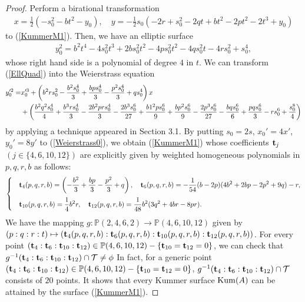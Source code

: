 \documentclass[10pt]{article}
\begin{document}
\begin{proof}
Perform a birational transformation 
\begin{align*}
x=\frac{1}{2} (- s_0^2 - b t^2 - y_0),
\quad
y=-\frac{1}{2} s_0 (-2 r +  s_0^2 - 2 q t + b t^2 - 2 p t^2 - 2 t^3 + y_0)
\end{align*}
to (\ref{KummerM1}).
Then, we have an elliptic surface
\begin{align}\label{EllQuad}
y_0^2= b^2 t^4- 4 s_0^2 t^3 + 2 b s_0^2 t^2 - 4 p s_0^2 t^2 - 4 q s_0^2 t -4 r s_0^2 + s_0^4,
\end{align}
whose right hand side is a polynomial of degree $4$ in $t$.
We can transform (\ref{EllQuad}) into the Weierstrass equation
\begin{align}\label{Weierstrass0}
y_0'^2= &x_0'^3+ \left(b^2 r s_0^2 - \frac{b^2 s_0^4}{3} + \frac{b p s_0^4}{3}  - \frac{p^2 s_0^4}{3} +  q s_0^4 \right) x \notag\\
&+\left(\frac{b^2 q^2 s_0^4}{4} + \frac{b^3 r s_0^4}{3} - \frac{2b^2 p r s_0^4 }{3}  - \frac{ 2 b^3 s_0^6}{27} + \frac{b1^2 p s_0^6}{9}  + \frac{b p^2 s_0^6}{9}  - \frac{ 2 p^3 s_0^6}{27} - \frac{b q s_0^6}{6}  + \frac{p q s_0^6}{3}  - r s_0^6 + \frac{s_0^8}{4}\right)
\end{align}
by applying a technique appeared in \cite{AKMMMP} Section 3.1.
By putting $s_0=2s$, $x_0'=4 x'$, $y_0'=8 y'$  to (\ref{Weierstrass0}), 
we obtain (\ref{KummerM1}) whose coefficients ${\bf t}_j$ $(j \in\{4,6,10,12\} )$ are explicitly given by weighted homogeneous polynomials in $p,q,r,b$ as follows:
\begin{align}\label{pqrT}
\begin{cases}
&\displaystyle {\bf t}_4(p,q,r,b)=\left(-\frac{b^2}{3} + \frac{b p}{3} - \frac{p^2}{3} + q\right), \quad {\bf t}_6(p,q,r,b)=-\frac{1}{54} (b - 2 p) (4 b^2 + 2 b p - 2 p^2 + 9 q) -r,  \vspace{2mm} \\
&\displaystyle {\bf t}_{10}(p,q,r,b)=\frac{1}{4} b^2 r,  \quad {\bf t}_{12}(p,q,r,b)=\frac{1}{48} b^2 (3 q^2 + 4 b r - 8 p r). \\
\end{cases}
\end{align}
We have the mapping $g: \mathbb{P}(2,4,6,2) \rightarrow \mathbb{P}(4,6,10,12)$ given by
$(p:q:r:t) \mapsto ({\bf t}_4(p,q,r,b):  {\bf t}_6(p,q,r,b): {\bf t}_{10}(p,q,r,b) :{\bf t}_{12}(p,q,r,b)) $.
For every point $({\bf t}_4:  {\bf t}_6: {\bf t}_{10} :{\bf t}_{12}) \in \mathbb{P}(4,6,10,12)-\{{\bf t}_{10}={\bf t}_{12}=0\}$,
we can check that $g^{-1} ({\bf t}_4:  {\bf t}_6: {\bf t}_{10} :{\bf t}_{12}) \cap \mathcal{T} \not = \phi$
In fact, for a generic point $({\bf t}_4:  {\bf t}_6: {\bf t}_{10} :{\bf t}_{12}) \in \mathbb{P}(4,6,10,12)-\{{\bf t}_{10}={\bf t}_{12}=0\}$,
$g^{-1} ({\bf t}_4:  {\bf t}_6: {\bf t}_{10} :{\bf t}_{12}) \cap \mathcal{T}$ consists of $20$ points.
It shows that every Kummer surface ${\rm Kum}(A)$ can be attained by the surface (\ref{KummerM1}).
\end{proof}
\end{document}
